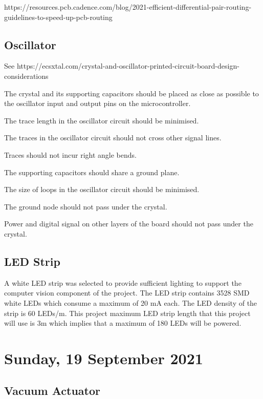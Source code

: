 https://resources.pcb.cadence.com/blog/2021-efficient-differential-pair-routing-guidelines-to-speed-up-pcb-routing


\subsection{Oscillator}

See https://ecsxtal.com/crystal-and-oscillator-printed-circuit-board-design-considerations

\begin{compactitem}
	\item The crystal and its supporting capacitors should be placed as close as possible to the oscillator input and output pins on the microcontroller.
	\item The trace length in the oscillator circuit should be minimised.
	\item The traces in the oscillator circuit should not cross other signal lines.
	\item Traces should not incur right angle bends.
	\item The supporting capacitors should share a ground plane.
	\item The size of loops in the oscillator circuit should be minimised.
	\item The ground node should not pass under the crystal.
	\item Power and digital signal on other layers of the board should not pass under the crystal. 
\end{compactitem}

\subsection{LED Strip}

A white \ac{LED} strip was selected to provide sufficient lighting to support the computer vision component of the project. The \ac{LED} strip contains 3528 \ac{SMD} white LEDs which consume a maximum of 20 mA each. The \ac{LED} density of the strip is 60 LEDs/m. This project maximum LED strip length that this project will use is 3m which implies that a maximum of 180 LEDs will be powered. 


\pendsign

\section[2021/09/19]{Sunday, 19 September 2021}

\subsection{Vacuum Actuator}

